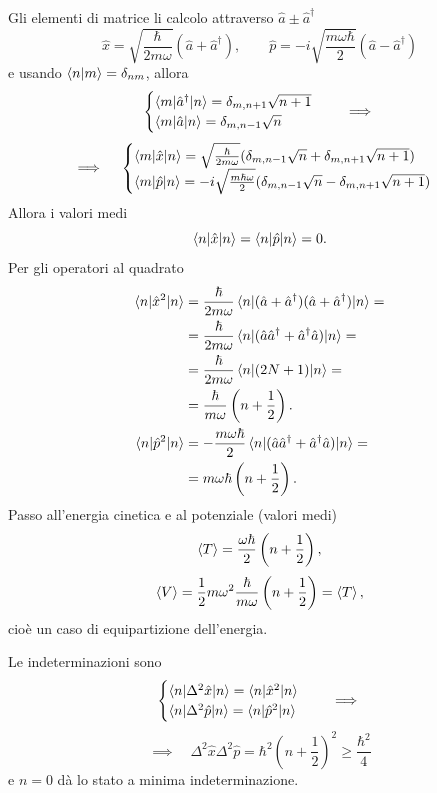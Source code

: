 \bigskip
\noindent
Gli elementi di matrice li calcolo attraverso \( \hat{a} \pm \hat{a}^\dag \)
\[
\hat{x} = \sqrt{\frac{\hbar}{2m\omega}}(\hat{a} + \hat{a}^\dag), \qquad \hat{p} = -i \sqrt{\frac{m\omega\hbar}{2}}(\hat{a} - \hat{a}^\dag)
\]
e usando \( \braket{n|m} = \delta_{nm} \), allora
\[
\begin{cases}
\braket{m|\hat{a}^\dag|n} = \delta_{m, n + 1}\sqrt{n + 1} \\
\braket{m|\hat{a}|n} = \delta_{m, n - 1}\sqrt{n}
\end{cases} \quad \implies 
\]
\[
\implies \quad \begin{cases}
\braket{m|\hat{x}|n} = \sqrt{\frac{\hbar}{2m\omega}} (\delta_{m, n - 1}\sqrt{n} + \delta_{m, n + 1}\sqrt{n + 1}) \\
\braket{m|\hat{p}|n} = -i \sqrt{\frac{m\hbar\omega}{2}} (\delta_{m, n - 1}\sqrt{n} - \delta_{m, n + 1}\sqrt{n + 1})
\end{cases}
\]
Allora i valori medi
\[
\braket{n|\hat{x}|n} = \braket{n|\hat{p}|n} = 0.
\]
Per gli operatori al quadrato
\begin{align*}
\braket{n|\hat{x}^2|n} &= \frac{\hbar}{2m\omega} \braket{n|(\hat{a} + \hat{a}^\dag)(\hat{a} + \hat{a}^\dag)|n} = \\
&= \frac{\hbar}{2m\omega} \braket{n|(\hat{a}\hat{a}^\dag + \hat{a}^\dag\hat{a})|n} = \\
&= \frac{\hbar}{2m\omega} \braket{n|(2N + 1)|n} = \\
&= \frac{\hbar}{m\omega} \left( n + \frac{1}{2} \right). \\
\braket{n|\hat{p}^2|n} &= -\frac{m\omega\hbar}{2} \braket{n|(\hat{a}\hat{a}^\dag + \hat{a}^\dag\hat{a})|n} = \\
&= m\omega\hbar \left( n + \frac{1}{2} \right).
\end{align*}
Passo all'energia cinetica e al potenziale (valori medi)
\[
\braket{T} = \frac{\omega\hbar}{2}\left( n + \frac{1}{2} \right),
\]
\[
\braket{V} = \frac{1}{2} m\omega^2 \frac{\hbar}{m\omega} \left( n + \frac{1}{2} \right) = \braket{T},
\]
cioè un caso di equipartizione dell'energia.

\bigskip
\noindent
Le indeterminazioni sono 
\[
\begin{cases}
\braket{n|\Delta^2 \hat{x}|n} = \braket{n|\hat{x}^2|n} \\
\braket{n|\Delta^2 \hat{p}|n} = \braket{n|\hat{p}^2|n}
\end{cases} \quad \implies
\]
\[
\implies \quad \Delta^2 \hat{x} \Delta^2 \hat{p} = \hbar^2 \left( n + \frac{1}{2} \right)^2 \geq \frac{\hbar^2}{4}
\]
e \( n = 0 \) dà lo stato a minima indeterminazione.